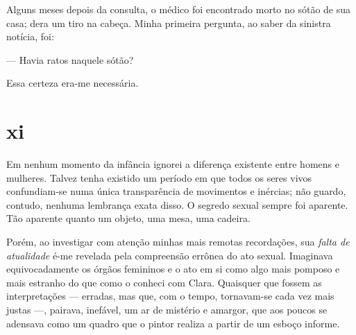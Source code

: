 Alguns meses depois da consulta, o médico foi encontrado morto no sótão de sua
casa; dera um tiro na cabeça. Minha primeira pergunta, ao saber da sinistra
notícia, foi:

--- Havia ratos naquele sótão?

Essa certeza era-me necessária.



\section{xi} 

 

Em nenhum momento da infância ignorei a diferença existente entre homens e
mulheres. Talvez tenha existido um período em que todos os seres vivos
confundiam-se numa única transparência de movimentos e inércias; não guardo,
contudo, nenhuma lembrança exata disso. O segredo sexual sempre foi aparente.
Tão aparente quanto um objeto, uma mesa, uma cadeira.

Porém, ao investigar com atenção minhas mais remotas recordações, sua \textit
{falta de atualidade} é-me revelada pela compreensão errônea do ato sexual.
Imaginava equivocadamente os órgãos femininos e o ato em si como algo mais
pomposo e mais estranho do que como o conheci com Clara. Quaisquer que fossem
as interpretações --- erradas, mas que, com o tempo, tornavam-se cada vez
mais justas ---, pairava, inefável, um ar de mistério e amargor, que aos
poucos se adensava como um quadro que o pintor realiza a partir de um esboço
informe.


